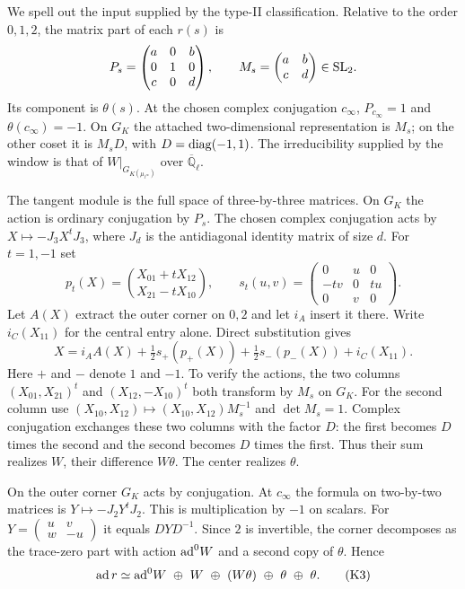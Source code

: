 We spell out the input supplied by the type-II classification.
Relative to the order \(0,1,2\), the matrix part of each \(r(s)\) is
\[
 P_s=\begin{pmatrix}a&0&b\\0&1&0\\c&0&d\end{pmatrix},\qquad
 M_s=\begin{pmatrix}a&b\\c&d\end{pmatrix}\in{\rm SL}_2 .
\]
Its component is \(\theta(s)\). At the chosen complex conjugation
\(c_\infty\), \(P_{c_\infty}=1\) and \(\theta(c_\infty)=-1\).
On \(G_K\) the attached two-dimensional representation is \(M_s\);
on the other coset it is \(M_sD\), with \(D={\rm diag}(-1,1)\).
The irreducibility supplied by the window is that of
\(W|_{G_{K(\mu_{\ell^\infty})}}\) over \(\overline{\mathbb Q}_\ell\).

The tangent module is the full space of three-by-three matrices.
On \(G_K\) the action is ordinary conjugation by \(P_s\). The chosen
complex conjugation acts by \(X\mapsto-J_3X^tJ_3\), where \(J_d\) is
the antidiagonal identity matrix of size \(d\). For \(t=1,-1\) set
\[
 p_t(X)=\binom{X_{01}+tX_{12}}{X_{21}-tX_{10}},\qquad
 s_t(u,v)=\begin{pmatrix}0&u&0\\-tv&0&tu\\0&v&0\end{pmatrix}.
\]
Let \(A(X)\) extract the outer corner on \(0,2\) and let \(i_A\)
insert it there. Write \(i_C(X_{11})\) for the central entry alone.
Direct substitution gives
\[
 X=i_A A(X)+\tfrac12s_+(p_+(X))
                +\tfrac12 s_-(p_-(X))+i_C(X_{11}).
 \tag{K2}
\]
Here \(+\) and \(-\) denote \(1\) and \(-1\). To verify the actions,
the two columns \((X_{01},X_{21})^t\) and
\((X_{12},-X_{10})^t\) both transform by \(M_s\) on \(G_K\).
For the second column use
\((X_{10},X_{12})\mapsto(X_{10},X_{12})M_s^{-1}\) and
\(\det M_s=1\). Complex conjugation exchanges these two columns with
the factor \(D\): the first becomes \(D\) times the second and the
second becomes \(D\) times the first. Thus their sum realizes \(W\),
their difference \(W\theta\). The center realizes \(\theta\).

On the outer corner \(G_K\) acts by conjugation. At \(c_\infty\)
the formula on two-by-two matrices is \(Y\mapsto-J_2Y^tJ_2\).
This is multiplication by \(-1\) on scalars. For
\(Y=\left(\begin{smallmatrix}u&v\\w&-u\end{smallmatrix}\right)\)
it equals \(DYD^{-1}\). Since \(2\) is invertible, the corner
decomposes as the trace-zero part with action \({\rm ad}^0 W\)
and a second copy of \(\theta\). Hence
\[
 {\rm ad}\,r \simeq
 {\rm ad}^0 W\ \oplus\ W\ \oplus\ (W\theta)\
                  \oplus\ \theta\ \oplus\ \theta .
 \tag{K3}
\]

